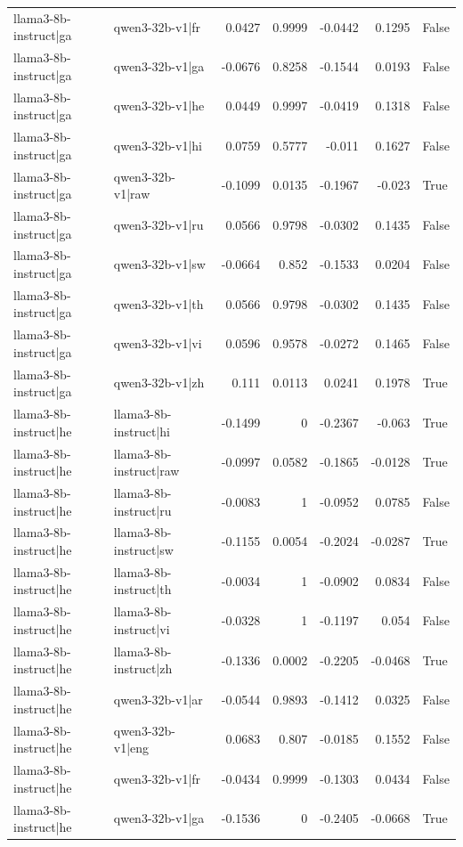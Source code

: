 \begin{table}
\begin{tabular}{l l r r r r l}
llama3-8b-instruct|ga & qwen3-32b-v1|fr & 0.0427 & 0.9999 & -0.0442 & 0.1295 & False \\
llama3-8b-instruct|ga & qwen3-32b-v1|ga & -0.0676 & 0.8258 & -0.1544 & 0.0193 & False \\
llama3-8b-instruct|ga & qwen3-32b-v1|he & 0.0449 & 0.9997 & -0.0419 & 0.1318 & False \\
llama3-8b-instruct|ga & qwen3-32b-v1|hi & 0.0759 & 0.5777 & -0.011 & 0.1627 & False \\
llama3-8b-instruct|ga & qwen3-32b-v1|raw & -0.1099 & 0.0135 & -0.1967 & -0.023 & True \\
llama3-8b-instruct|ga & qwen3-32b-v1|ru & 0.0566 & 0.9798 & -0.0302 & 0.1435 & False \\
llama3-8b-instruct|ga & qwen3-32b-v1|sw & -0.0664 & 0.852 & -0.1533 & 0.0204 & False \\
llama3-8b-instruct|ga & qwen3-32b-v1|th & 0.0566 & 0.9798 & -0.0302 & 0.1435 & False \\
llama3-8b-instruct|ga & qwen3-32b-v1|vi & 0.0596 & 0.9578 & -0.0272 & 0.1465 & False \\
llama3-8b-instruct|ga & qwen3-32b-v1|zh & 0.111 & 0.0113 & 0.0241 & 0.1978 & True \\
llama3-8b-instruct|he & llama3-8b-instruct|hi & -0.1499 & 0 & -0.2367 & -0.063 & True \\
llama3-8b-instruct|he & llama3-8b-instruct|raw & -0.0997 & 0.0582 & -0.1865 & -0.0128 & True \\
llama3-8b-instruct|he & llama3-8b-instruct|ru & -0.0083 & 1 & -0.0952 & 0.0785 & False \\
llama3-8b-instruct|he & llama3-8b-instruct|sw & -0.1155 & 0.0054 & -0.2024 & -0.0287 & True \\
llama3-8b-instruct|he & llama3-8b-instruct|th & -0.0034 & 1 & -0.0902 & 0.0834 & False \\
llama3-8b-instruct|he & llama3-8b-instruct|vi & -0.0328 & 1 & -0.1197 & 0.054 & False \\
llama3-8b-instruct|he & llama3-8b-instruct|zh & -0.1336 & 0.0002 & -0.2205 & -0.0468 & True \\
llama3-8b-instruct|he & qwen3-32b-v1|ar & -0.0544 & 0.9893 & -0.1412 & 0.0325 & False \\
llama3-8b-instruct|he & qwen3-32b-v1|eng & 0.0683 & 0.807 & -0.0185 & 0.1552 & False \\
llama3-8b-instruct|he & qwen3-32b-v1|fr & -0.0434 & 0.9999 & -0.1303 & 0.0434 & False \\
llama3-8b-instruct|he & qwen3-32b-v1|ga & -0.1536 & 0 & -0.2405 & -0.0668 & True \\

\end{tabular}
\end{table}
